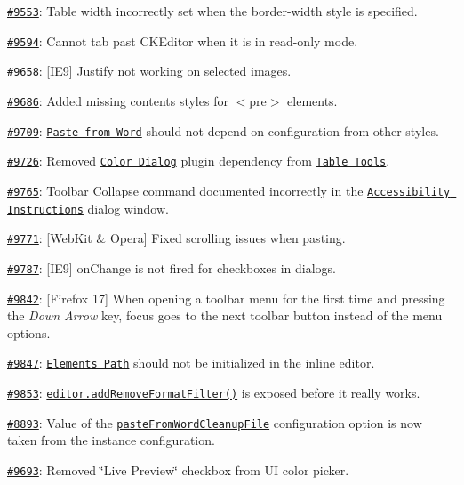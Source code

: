 {\begin{DoxyItemize}
\item \href{http://dev.ckeditor.com/ticket/9553}{\tt \#9553}\+: Table width incorrectly set when the {\ttfamily border-\/width} style is specified.
\item \href{http://dev.ckeditor.com/ticket/9594}{\tt \#9594}\+: Cannot tab past C\+K\+Editor when it is in read-\/only mode.
\item \href{http://dev.ckeditor.com/ticket/9658}{\tt \#9658}\+: \mbox{[}I\+E9\mbox{]} Justify not working on selected images.
\item \href{http://dev.ckeditor.com/ticket/9686}{\tt \#9686}\+: Added missing contents styles for {\ttfamily $<$pre$>$} elements.
\item \href{http://dev.ckeditor.com/ticket/9709}{\tt \#9709}\+: \href{http://ckeditor.com/addon/pastefromword}{\tt Paste from Word} should not depend on configuration from other styles.
\item \href{http://dev.ckeditor.com/ticket/9726}{\tt \#9726}\+: Removed \href{http://ckeditor.com/addon/colordialog}{\tt Color Dialog} plugin dependency from \href{http://ckeditor.com/addon/tabletools}{\tt Table Tools}.
\item \href{http://dev.ckeditor.com/ticket/9765}{\tt \#9765}\+: Toolbar Collapse command documented incorrectly in the \href{http://ckeditor.com/addon/a11yhelp}{\tt Accessibility Instructions} dialog window.
\item \href{http://dev.ckeditor.com/ticket/9771}{\tt \#9771}\+: \mbox{[}Web\+Kit \& Opera\mbox{]} Fixed scrolling issues when pasting.
\item \href{http://dev.ckeditor.com/ticket/9787}{\tt \#9787}\+: \mbox{[}I\+E9\mbox{]} {\ttfamily on\+Change} is not fired for checkboxes in dialogs.
\item \href{http://dev.ckeditor.com/ticket/9842}{\tt \#9842}\+: \mbox{[}Firefox 17\mbox{]} When opening a toolbar menu for the first time and pressing the {\itshape Down Arrow} key, focus goes to the next toolbar button instead of the menu options.
\item \href{http://dev.ckeditor.com/ticket/9847}{\tt \#9847}\+: \href{http://ckeditor.com/addon/elementspath}{\tt Elements Path} should not be initialized in the inline editor.
\item \href{http://dev.ckeditor.com/ticket/9853}{\tt \#9853}\+: \href{http://docs.ckeditor.com/#!/api/CKEDITOR.editor-method-addRemoveFormatFilter}{\tt {\ttfamily editor.\+add\+Remove\+Format\+Filter()}} is exposed before it really works.
\item \href{http://dev.ckeditor.com/ticket/8893}{\tt \#8893}\+: Value of the \href{http://docs.ckeditor.com/#!/api/CKEDITOR.config-cfg-pasteFromWordCleanupFile}{\tt {\ttfamily paste\+From\+Word\+Cleanup\+File}} configuration option is now taken from the instance configuration.
\item \href{http://dev.ckeditor.com/ticket/9693}{\tt \#9693}\+: Removed \char`\"{}\+Live Preview\char`\"{} checkbox from UI color picker.
\end{DoxyItemize}}

